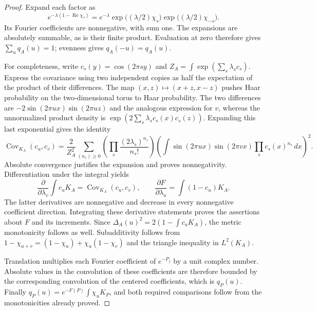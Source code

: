 \begin{proof}
Expand each factor as
\[
 e^{-\lambda(1-\operatorname{Re}\chi_s)}
 =e^{-\lambda}
   \exp\bigl((\lambda/2)\chi_s\bigr)
   \exp\bigl((\lambda/2)\chi_{-s}\bigr).
\]
Its Fourier coefficients are nonnegative, with sum one.  The expansions
are absolutely summable, as is their finite product.  Evaluation at zero
therefore gives $\sum_uq_A(u)=1$; evenness gives $q_A(-u)=q_A(u)$.

For completeness, write $c_s(y)=\cos(2\pi sy)$ and
$Z_A=\int\exp(\sum_s\lambda_sc_s)$.  Express the covariance using two
independent copies as half the expectation of the product of their
differences.  The map $(x,z)\mapsto(x+z,x-z)$ pushes Haar probability on
the two-dimensional torus to Haar probability.  The two differences are
$-2\sin(2\pi ux)\sin(2\pi uz)$ and the analogous expression for $v$,
whereas the unnormalized product density is
$\exp(2\sum_s\lambda_sc_s(x)c_s(z))$.  Expanding this last exponential
gives the identity
\[
 \operatorname{Cov}_{K_A}(c_u,c_v)
 =\frac{2}{Z_A^2}
 \sum_{(n_s)\ge0}\left(\prod_s\frac{(2\lambda_s)^{n_s}}{n_s!}\right)
 \left(\int\sin(2\pi ux)\sin(2\pi vx)
                 \prod_sc_s(x)^{n_s}\,dx\right)^2.
\]
Absolute convergence justifies the expansion and proves nonnegativity.
Differentiation under the integral yields
\[
 \frac{\partial}{\partial\lambda_v}\int c_uK_A
 =\operatorname{Cov}_{K_A}(c_u,c_v),\qquad
 \frac{\partial F}{\partial\lambda_u}=\int(1-c_u)K_A.
\]
The latter derivatives are nonnegative and decrease in every nonnegative
coefficient direction.  Integrating these derivative statements proves
the assertions about $F$ and its increments.  Since
$\Delta_A(u)^2=2(1-\int c_uK_A)$, the metric monotonicity follows as well.
Subadditivity follows from
$1-\chi_{u+v}=(1-\chi_u)+\chi_u(1-\chi_v)$ and the triangle inequality
in $L^2(K_A)$.

Translation multiplies each Fourier coefficient of $e^{-P_j}$ by a
unit complex number.  Absolute values in the convolution of these
coefficients are therefore bounded by the corresponding convolution of
the centered coefficients, which is $q_P(u)$.  Finally
$q_P(u)=e^{-F(P)}\int\chi_uK_P$, and both required comparisons follow
from the monotonicities already proved.
\end{proof}

